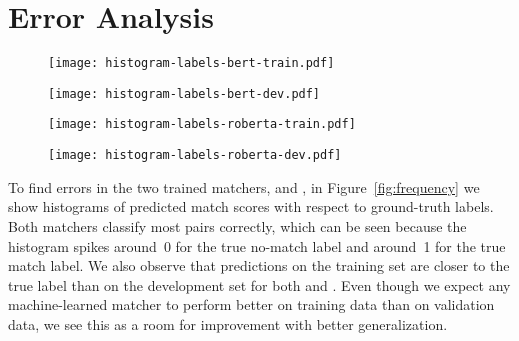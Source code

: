 \section{Error Analysis}\label{error-analysis}

\begin{figure*}
    \centering
    \begin{subfigure}{0.445\textwidth}
        \centering
        \texttt{[image: histogram-labels-bert-train.pdf]}
        \label{subfig:bert_train}
    \end{subfigure}
    \hfill
    \begin{subfigure}{0.445\textwidth}
        \centering
        \texttt{[image: histogram-labels-bert-dev.pdf]}
        \label{subfig:bert_dev}
    \end{subfigure}
    \begin{subfigure}{0.445\textwidth}
        \centering
        \texttt{[image: histogram-labels-roberta-train.pdf]}
        \label{subfig:roberta_train}
    \end{subfigure}
    \hfill
    \begin{subfigure}{0.445\textwidth}
        \centering
        \texttt{[image: histogram-labels-roberta-dev.pdf]}
        \label{subfig:roberta_dev}
    \end{subfigure}
    \caption{Histograms of predicted labels on the training and validation sets for argument key point pairs with the \BertBase and \RobertaBase classifiers. For good classifiers, predicted labels should approximately equal the true label~(0~or~1).}
    \label{fig:frequency}
\end{figure*}
To find errors in the two trained matchers, \BertBase and \RobertaBase, in Figure~\ref{fig:frequency} we show histograms of predicted match scores with respect to ground-truth labels.
Both matchers classify most pairs correctly, which can be seen because the histogram spikes around~0 for the true no-match label and around~1 for the true match label.
We also observe that predictions on the training set are closer to the true label than on the development set for both \RobertaBase and \BertBase.
Even though we expect any machine-learned matcher to perform better on training data than on validation data, we see this as a room for improvement with better generalization.
